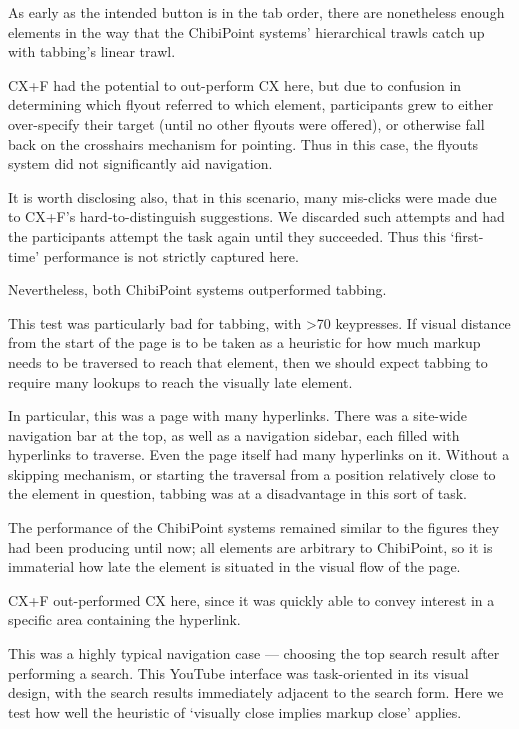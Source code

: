 \documentclass[11pt,openright,a4paper]{report}
\begin{document}
As early as the intended button is in the tab order, there are nonetheless enough elements in the way that the ChibiPoint systems' hierarchical trawls catch up with tabbing's linear trawl.

CX+F had the potential to out-perform CX here, but due to confusion in determining which flyout referred to which element, participants grew to either over-specify their target (until no other flyouts were offered), or otherwise fall back on the crosshairs mechanism for pointing. Thus in this case, the flyouts system did not significantly aid navigation.

It is worth disclosing also, that in this scenario, many mis-clicks were made due to CX+F's hard-to-distinguish suggestions. We discarded such attempts and had the participants attempt the task again until they succeeded. Thus this `first-time' performance is not strictly captured here.

Nevertheless, both ChibiPoint systems outperformed tabbing.

This test was particularly bad for tabbing, with >70 keypresses. If visual distance from the start of the page is to be taken as a heuristic for how much markup needs to be traversed to reach that element, then we should expect tabbing to require many lookups to reach the visually late element.

In particular, this was a page with many hyperlinks. There was a site-wide navigation bar at the top, as well as a navigation sidebar, each filled with hyperlinks to traverse. Even the page itself had many hyperlinks on it. Without a skipping mechanism, or starting the traversal from a position relatively close to the element in question, tabbing was at a disadvantage in this sort of task.

The performance of the ChibiPoint systems remained similar to the figures they had been producing until now; all elements are arbitrary to ChibiPoint, so it is immaterial how late the element is situated in the visual flow of the page.

CX+F out-performed CX here, since it was quickly able to convey interest in a specific area containing the hyperlink.

This was a highly typical navigation case --- choosing the top search result after performing a search. This YouTube interface was task-oriented in its visual design, with the search results immediately adjacent to the search form. Here we test how well the heuristic of `visually close implies markup close' applies.
\end{document}
